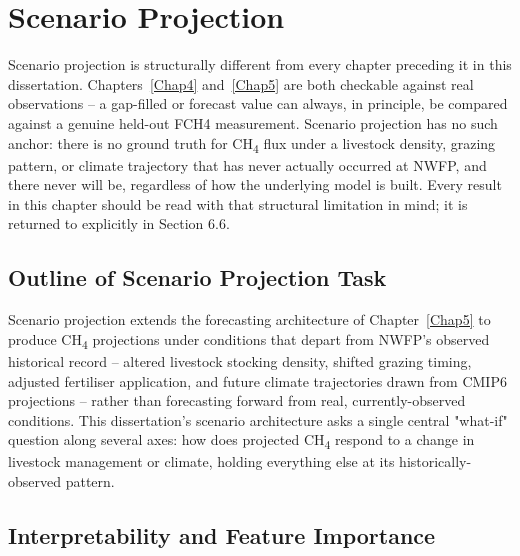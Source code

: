 \chapter{Scenario Projection} \label{Chap6}

Scenario projection is structurally different from every chapter preceding it in this
dissertation. Chapters~\ref{Chap4} and~\ref{Chap5} are both checkable against real observations --
a gap-filled or forecast value can always, in principle, be compared against a genuine held-out
FCH4 measurement. Scenario projection has no such anchor: there is no ground truth for
CH\textsubscript{4} flux under a livestock density, grazing pattern, or climate trajectory that has
never actually occurred at NWFP, and there never will be, regardless of how the underlying model is
built. Every result in this chapter should be read with that structural limitation in mind; it is
returned to explicitly in Section 6.6.

\section{Outline of Scenario Projection Task}

Scenario projection extends the forecasting architecture of Chapter~\ref{Chap5} to produce
CH\textsubscript{4} projections under conditions that depart from NWFP's observed historical
record -- altered livestock stocking density, shifted grazing timing, adjusted fertiliser
application, and future climate trajectories drawn from CMIP6 projections -- rather than forecasting
forward from real, currently-observed conditions. This dissertation's scenario architecture asks a
single central "what-if" question along several axes: how does projected CH\textsubscript{4}
respond to a change in livestock management or climate, holding everything else at its
historically-observed pattern.

\section{Interpretability and Feature Importance}

